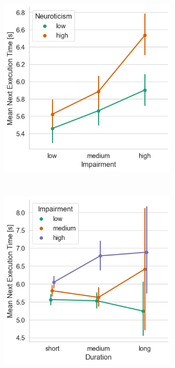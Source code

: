 \begin{figure}
    \centering
    \begin{subfigure}[t]{\columnwidth}
        \centering
        \includegraphics[width=.8\columnwidth]{./model_data/imp_neur_vs_exectime.png}
        \caption{}\label{fig:timing:impneurvsetime}
    \end{subfigure}\\
    \begin{subfigure}[t]{\columnwidth}
        \centering
        \includegraphics[width=.8\columnwidth]{./model_data/duration_vs_exectime.png}
        \caption{}\label{fig:timing:durvsetime}

\end{subfigure}
\end{figure}
